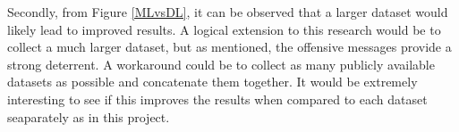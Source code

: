 \documentclass[12pt,a4paper]{article}
\begin{document}
Secondly, from Figure \ref{MLvsDL}, it can be observed that a larger dataset would likely lead to improved results. A logical extension to this research would be to collect a much larger dataset, but as mentioned, the offensive messages provide a strong deterrent. A workaround could be to collect as many publicly available datasets as possible and concatenate them together. It would be extremely interesting to see if this improves the results when compared to each dataset seaparately as in this project.











 
\end{document}

